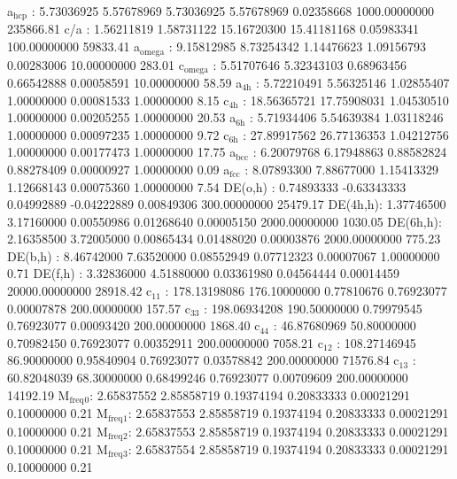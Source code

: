 \documentclass[11pt]{article}
\begin{document}
a\(_{\text{hcp}}\)   :   5.73036925   5.57678969   5.73036925   5.57678969   0.02358668 1000.00000000    235866.81
c/a     :   1.56211819   1.58731122  15.16720300  15.41181168   0.05983341 100.00000000     59833.41
a\(_{\text{omega}}\) :   9.15812985   8.73254342   1.14476623   1.09156793   0.00283006  10.00000000       283.01
c\(_{\text{omega}}\) :   5.51707646   5.32343103   0.68963456   0.66542888   0.00058591  10.00000000        58.59
a\(_{\text{4h}}\)    :   5.72210491   5.56325146   1.02855407   1.00000000   0.00081533   1.00000000         8.15
c\(_{\text{4h}}\)    :  18.56365721  17.75908031   1.04530510   1.00000000   0.00205255   1.00000000        20.53
a\(_{\text{6h}}\)    :   5.71934406   5.54639384   1.03118246   1.00000000   0.00097235   1.00000000         9.72
c\(_{\text{6h}}\)    :  27.89917562  26.77136353   1.04212756   1.00000000   0.00177473   1.00000000        17.75
a\(_{\text{bcc}}\)   :   6.20079768   6.17948863   0.88582824   0.88278409   0.00000927   1.00000000         0.09
a\(_{\text{fcc}}\)   :   8.07893300   7.88677000   1.15413329   1.12668143   0.00075360   1.00000000         7.54
DE(o,h) :   0.74893333  -0.63343333   0.04992889  -0.04222889   0.00849306 300.00000000     25479.17
DE(4h,h):   1.37746500   3.17160000   0.00550986   0.01268640   0.00005150 2000.00000000      1030.05
DE(6h,h):   2.16358500   3.72005000   0.00865434   0.01488020   0.00003876 2000.00000000       775.23
DE(b,h) :   8.46742000   7.63520000   0.08552949   0.07712323   0.00007067   1.00000000         0.71
DE(f,h) :   3.32836000   4.51880000   0.03361980   0.04564444   0.00014459 20000.00000000     28918.42
c\(_{\text{11}}\)    : 178.13198086 176.10000000   0.77810676   0.76923077   0.00007878 200.00000000       157.57
c\(_{\text{33}}\)    : 198.06934208 190.50000000   0.79979545   0.76923077   0.00093420 200.00000000      1868.40
c\(_{\text{44}}\)    :  46.87680969  50.80000000   0.70982450   0.76923077   0.00352911 200.00000000      7058.21
c\(_{\text{12}}\)    : 108.27146945  86.90000000   0.95840904   0.76923077   0.03578842 200.00000000     71576.84
c\(_{\text{13}}\)    :  60.82048039  68.30000000   0.68499246   0.76923077   0.00709609 200.00000000     14192.19
M\(_{\text{freq}}\)\(_{\text{0}}\):   2.65837552   2.85858719   0.19374194   0.20833333   0.00021291   0.10000000         0.21
M\(_{\text{freq}}\)\(_{\text{1}}\):   2.65837553   2.85858719   0.19374194   0.20833333   0.00021291   0.10000000         0.21
M\(_{\text{freq}}\)\(_{\text{2}}\):   2.65837553   2.85858719   0.19374194   0.20833333   0.00021291   0.10000000         0.21
M\(_{\text{freq}}\)\(_{\text{3}}\):   2.65837554   2.85858719   0.19374194   0.20833333   0.00021291   0.10000000         0.21
\end{document}
